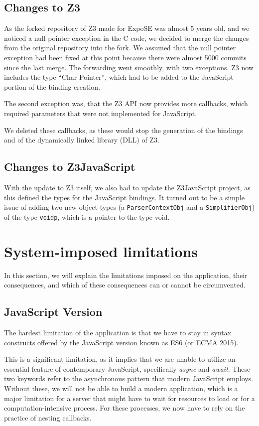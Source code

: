 \subsection{Changes to Z3}
\label{sec:changes-z3}
As the forked repository of Z3 made for ExpoSE was almost 5 years old, and we noticed a null pointer exception in the C code, we decided to merge the changes from the original repository into the fork. We assumed that the null pointer exception had been fixed at this point because there were almost 5000 commits since the last merge. 
The forwarding went smoothly, with two exceptions. Z3 now includes the type “Char Pointer”, which had to be added to the JavaScript portion of the binding creation.

The second exception was, that the Z3 API now provides more callbacks, which required parameters that were not implemented for JavaScript. 

We deleted these callbacks, as these would stop the generation of the bindings and of the dynamically linked library (DLL) of Z3.

\subsection{Changes to Z3JavaScript}
\label{sec:changes-z3js}
With the update to Z3 itself, we also had to update the Z3JavaScript project, as this defined the types for the JavaScript bindings. It turned out to be a simple issue of adding two new object types (a {\tt{ParserContextObj}} and a {\tt{SimplifierObj}}) of the type {\tt{voidp}}, which is a pointer to the type void.


\section{System-imposed limitations}
\label{sec:limits}
In this section, we will explain the limitations imposed on the application, their consequences, and which of these consequences can or cannot be circumvented.
\subsection{JavaScript Version}
\label{sec:jsversion}
The hardest limitation of the application is that we have to stay in syntax constructs offered by the JavaScript version known as ES6 (or ECMA 2015).

This is a significant limitation, as it implies that we are unable to utilize an essential feature of contemporary JavaScript, specifically \textit{async} and \textit{await}. These two keywords refer to the asynchronous pattern that modern JavaScript employs. Without these, we will not be able to build a modern application, which is a major limitation for a server that might have to wait for resources to load or for a computation-intensive process. For these processes, we now have to rely on the practice of nesting callbacks. 





